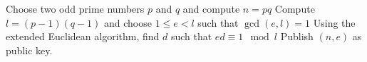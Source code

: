 \documentclass{subfiles}
\begin{document}
    \begin{procedure}
        \caption{RSA-Keygen()}\label{proc:RSA-keygen}
        \nl Choose two odd prime numbers $ p $ and $ q $ and compute $ n = pq $ \DontPrintSemicolon\;
        \nl Compute $ l = (p - 1)(q - 1) $ and choose $ 1 \le e < l$ such that $ \gcd(e, l) = 1$ \DontPrintSemicolon\;
        \nl Using the extended Euclidean algorithm, find $ d $ such that \(ed \equiv 1 \mod l\) \DontPrintSemicolon\;
        \nl Publish $ (n, e) $ as public key.
    \end{procedure}
\end{document}
